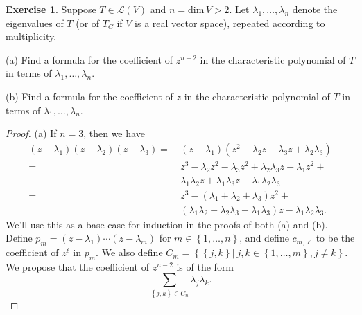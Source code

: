 \documentclass{article}
\theoremstyle{definition}
\newtheorem{ex}{Exercise}
\begin{document}
\begin{ex}
	Suppose $T \in \mathcal{L}(V)$ and $n = \mathrm{dim}\,V > 2$.
	Let $\lambda_1, \dots, \lambda_n$ denote the eigenvalues of $T$ (or of $T_C$ if $V$ is a real vector space), repeated according to multiplicity.
	\item{(a)} Find a formula for the coefficient of $z^{n - 2}$ in the characteristic polynomial of $T$ in terms of $\lambda_1, \dots, \lambda_n$.
	\item{(b)} Find a formula for the coefficient of $z$ in the characteristic polynomial of $T$ in terms of $\lambda_1, \dots, \lambda_n$.
\end{ex}
\begin{proof}
	\item{(a)} If $n = 3$, then we have \begin{align*}
		(z - \lambda_1)(z - \lambda_2)(z - \lambda_3)  =\  & (z - \lambda_1)(z^2 - \lambda_2 z - \lambda_3 z + \lambda_2 \lambda_3)                               \\
		=\                                                 & z^3 - \lambda_2 z^2 - \lambda_3 z^2 + \lambda_2 \lambda_3 z - \lambda_1 z^2 +                        \\
		                                                   & \lambda_1 \lambda_2 z + \lambda_1 \lambda_3 z - \lambda_1 \lambda_2 \lambda_3                        \\
		=\                                                 & z^3 - (\lambda_1 + \lambda_2 + \lambda_3) z^2 +                                                      \\
		                                                   & (\lambda_1 \lambda_2 + \lambda_2 \lambda_3 + \lambda_1 \lambda_3) z - \lambda_1 \lambda_2 \lambda_3.
	\end{align*}
	We'll use this as a base case for induction in the proofs of both (a) and (b).
	Define $p_m = (z - \lambda_1)\cdots(z - \lambda_m)$ for $m \in \left\lbrace 1, \dots, n \right\rbrace$, and define $c_{m, \ell}$ to be the coefficient of $z^{\ell}$ in $p_m$.
	We also define $C_m = \left\lbrace \left\lbrace j, k \right\rbrace |\ j, k \in \left\lbrace 1, \dots, m \right\rbrace, j \neq k \right\rbrace$.
	We propose that the coefficient of $z^{n - 2}$ is of the form \begin{equation*}
		\sum _{\left\lbrace j, k \right\rbrace \in C_n} \lambda_j \lambda_k.
	\end{equation*}


\end{proof}
\end{document}
